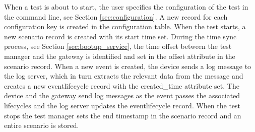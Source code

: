 When a test is about to start, the user specifies the configuration of the test
in the command line, see Section \ref{sec:configuration}. A new record for each
configuration key is created in the configuration table. When the test starts,
a new scenario record is created with its start time set.  During the time sync
process, see Section \ref{sec:bootup_service}, the time offset between the test
manager and the gateway is identified and set in the offset attribute in the
scenario record. When a new event is created, the device sends a log message to
the log server, which in turn extracts the relevant data from the message and
creates a new eventlifecycle record with the created\_time attribute set. The
device and the gateway send log messages as the event passes the associated
lifecycles and the log server updates the eventlifecycle record. When the test
stops the test manager sets the end timestamp in the scenario record and an
entire scenario is stored.

